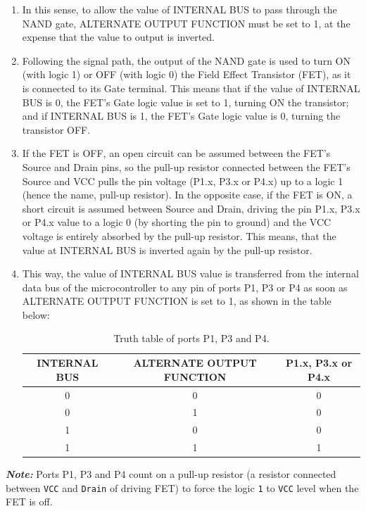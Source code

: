 \documentclass[10pt, letterpaper]{article}
\begin{document}
\begin{enumerate}
\item In this sense, to allow the value of INTERNAL BUS to pass through the NAND gate, ALTERNATE OUTPUT FUNCTION must be set to 1, at the expense that the value to output is inverted.
\item Following the signal path, the output of the NAND gate is used to turn ON (with logic 1) or OFF (with logic 0) the Field Effect Transistor (FET), as it is connected to its Gate terminal. This means that if the value of INTERNAL BUS is 0, the FET’s Gate logic value is set to 1, turning ON the transistor; and if INTERNAL BUS is 1, the FET’s Gate logic value is 0, turning the transistor OFF.
\item If the FET is OFF, an open circuit can be assumed between the FET’s Source and Drain pins, so the pull-up resistor connected between the FET’s Source and VCC pulls the pin voltage (P1.x, P3.x or P4.x) up to a logic 1 (hence the name, pull-up resistor). In the opposite case, if the FET is ON, a short circuit is assumed between Source and Drain, driving the pin P1.x, P3.x or P4.x value to a logic 0 (by shorting the pin to ground) and the VCC voltage is entirely absorbed by the pull-up resistor. This means, that the value at INTERNAL BUS is inverted again by the pull-up resistor.  
\item This way, the value of INTERNAL BUS value is transferred from the internal data bus of the microcontroller to any pin of ports P1, P3 or P4 as soon as ALTERNATE OUTPUT FUNCTION is set to 1, as shown in the table below:

\begin{table}[h!]
	\begin{center}
		\begin{tabular}{| c c | c |}
			\hline
			INTERNAL BUS & ALTERNATE OUTPUT FUNCTION & P1.x, P3.x or P4.x \\
			\hline
			0 & 0 & 0 \\
			0 & 1 & 0 \\
			1 & 0 & 0 \\
			1 & 1 & 1 \\
			\hline
		\end{tabular}
	\end{center}
	\caption{Truth table of ports P1, P3 and P4.}
\end{table}
\end{enumerate}

\emph{\textbf{Note:}} Ports P1, P3 and P4 count on a pull-up resistor (a resistor connected between \texttt{VCC} and \texttt{Drain} of driving FET) to force the logic \texttt{1} to \texttt{VCC} level when the FET is off.
\end{document}
